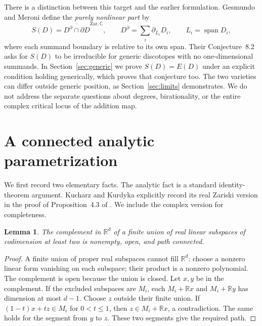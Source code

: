 \documentclass[11pt]{article}
\newtheorem{lemma}[theorem]{Lemma}
\newcommand{\Span}{\operatorname{span}}
\newcommand{\R}{\mathbb R}
\newcommand{\C}{\mathbb C}
\begin{document}
There is a distinction between this target and the earlier formulation.
Gesmundo and Meroni define the \emph{purely nonlinear part}
\cite[Definition~3.3]{GM2022} by
\begin{equation}\label{eq:S}
 S(D)=\overline{D^\partial\cap\partial D}^{\mathrm{Zar},\C},
 \qquad D^\partial=\sum_i\partial_{L_i}D_i,
 \qquad L_i=\Span D_i,
\end{equation}
where each summand boundary is relative to its own span. Their
Conjecture~8.2 asks for \(S(D)\) to be irreducible for generic
discotopes with no one-dimensional summands. In Section~\ref{sec:generic}
we prove \(S(D)=E(D)\) under an explicit condition holding generically,
which proves that conjecture too. The two varieties can differ outside
generic position, as Section~\ref{sec:limits} demonstrates. We do not
address the separate questions about degrees, birationality, or the
entire complex critical locus of the addition map.

\section{A connected analytic parametrization}

We first record two elementary facts. The analytic fact is a standard
identity-theorem argument. Kucharz and Kurdyka explicitly record its
real Zariski version in the proof of Proposition~4.3 of
\cite[p.~95]{KK2017}. We include the complex version for completeness.

\begin{lemma}\label{lem:connected}
The complement in \(\R^d\) of a finite union of real linear subspaces
of codimension at least two is nonempty, open, and path connected.
\end{lemma}
\begin{proof}
A finite union of proper real subspaces cannot fill \(\R^d\): choose a
nonzero linear form vanishing on each subspace; their product is a
nonzero polynomial. The complement is open because the union is closed.
Let \(x,y\) be in the complement. If the excluded subspaces are \(M_i\),
each \(M_i+\R x\) and \(M_i+\R y\) has dimension at most \(d-1\).
Choose \(z\) outside their finite union. If
\((1-t)x+tz\in M_i\) for \(0<t\le1\), then
\(z\in M_i+\R x\), a contradiction. The same holds for the segment
from \(y\) to \(z\). These two segments give the required path.
\end{proof}
\end{document}
